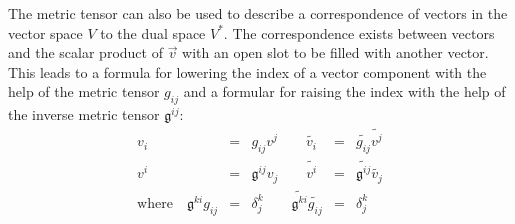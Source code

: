 The metric tensor can also be used to describe a correspondence of vectors in the vector
space $V$ to the dual space $V^*$. The correspondence exists between vectors and the
scalar product of $\vec{v}$ with an open slot to be filled with another vector. This leads
to a formula for lowering the index of a vector component with the help of the metric
tensor $g_{ij}$ and a formular for raising the index with the help of the inverse metric
tensor $\mathfrak{g}^{ij}$:
\begin{equation}
    \begin{array}{rclrcl}
        v_i & = & g_{ij} v^j \qquad 
        \widetilde{v_i} & = & \widetilde{g_{ij}} \widetilde{v^j} \\
        v^i & = & \mathfrak{g}^{ij} v_j \qquad 
        \widetilde{v^i} & = & \widetilde{\mathfrak{g}^{ij}} \widetilde{v_j} \\
        \text{where}\quad \mathfrak{g}^{ki}g_{ij} & = &  \delta^k_j \qquad
        \widetilde{\mathfrak{g}^{ki}}\widetilde{g_{ij}} & = & \delta^k_j
    \end{array}
\end{equation} \\

\newpage